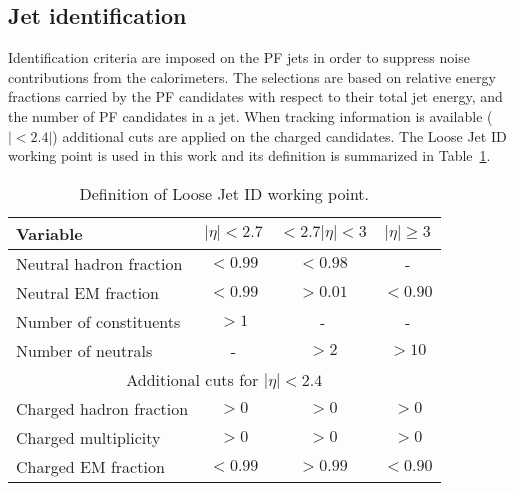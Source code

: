 \subsection{Jet identification}
Identification criteria are imposed on the PF jets in order to suppress noise contributions from the calorimeters. 
The selections are based on relative energy fractions carried by the PF candidates with respect to their total jet energy, and the number of PF candidates in a jet. 
When tracking information is available ($|<2.4|$) additional cuts are applied on the charged candidates.  
The Loose Jet ID working point is used in this work and its definition is summarized in Table~\ref{tab:jetId}. 

\begin{table}[ht!]
\def\arraystretch{1.2}
    \caption{Definition of Loose Jet ID working point.}
    \label{tab:jetId}
    \begin{center}
        \begin{tabular}{ l c c c }
        \hline \hline
        Variable               &  $|\eta|<2.7$&  $<2.7|\eta|<3$ &  $|\eta|\geq3$     \\ \hline
        Neutral hadron fraction & $<0.99$   & $<0.98$  & -      \\
        Neutral EM fraction & $<0.99$   & $>0.01$  & $<0.90$      \\
        Number of constituents & $>1$    & -  & -      \\
        Number of neutrals & -    & $>2$  & $>10$      \\
        \multicolumn{4}{c}{Additional cuts for $|\eta|<2.4$}                \\
        Charged hadron fraction & $>0$   & $>0$  & $>0$      \\
        Charged multiplicity & $>0$   & $>0$  & $>0$      \\
        Charged EM fraction & $<0.99$   & $>0.99$  & $<0.90$      \\
\hline\hline
\end{tabular}
\end{center}
\end{table}                                                                             
